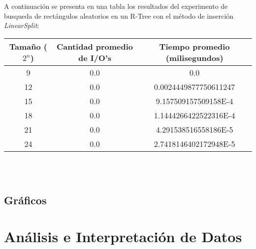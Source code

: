 \documentclass[letterpaper,12pt]{article}
\begin{document}
A continuación se presenta en una tabla los resultados del experimento de busqueda de rectángulos aleatorios en un R-Tree con el método de inserción \textit{LinearSplit}: \\
\begin{tabular}{|c|c|c|}
\hline
\textbf{Tama\~no ($2^n$)} & \textbf{Cantidad promedio de I/O's} & \textbf{Tiempo promedio (milisegundos)} \\
\hline
9 & 0.0 & 0.0 \\
\hline
12 & 0.0 & 0.0024449877750611247 \\
\hline
15 & 0.0 & 9.157509157509158E-4 \\
\hline
18 & 0.0 & 1.1444266422522316E-4 \\
\hline
21 & 0.0 & 4.291538516558186E-5 \\
\hline
24 & 0.0 & 2.7418146402172948E-5 \\
\hline
\end{tabular}
\\ \\




\newpage
\subsection{Gráficos}
\iffalse
\begin{figure}[bp!]
  \centering
    \texttt{[image: quadratic\_io]}
  \caption{Gr\'afico Tama\~no vs I/O's para QuadraticSplit}
  \label{fig:f1}
\end{figure}

\begin{figure}[bp!]
  \centering
    \texttt{[image: quadratic\_tiempo]}
  \caption{Gr\'afico Tama\~no vs Tiempo para QuadraticSplit}
  \label{fig:f2}
\end{figure}

\begin{figure}[bp!]
  \centering
    \texttt{[image: linear\_io]}
  \caption{Gr\'afico Tama\~no vs I/O's para LinearSplit}
  \label{fig:f3}
\end{figure}

\begin{figure}[bp!]
  \centering
    \texttt{[image: linear\_tiempo]}
  \caption{Gr\'afico Tama\~no vs Tiempo para LinearSplit}
  \label{fig:f4}
\end{figure}
\fi
\newpage
\section{An\'alisis e Interpretaci\'on de Datos}
\end{document}
